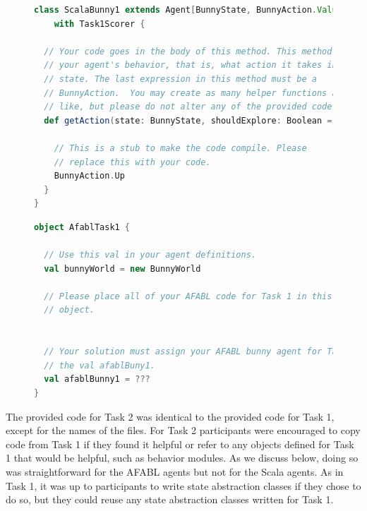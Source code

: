 \begin{figure}[!h]
\begin{center}

\begin{lstlisting}[language=Scala]
class ScalaBunny1 extends Agent[BunnyState, BunnyAction.Value]
    with Task1Scorer {

  // Your code goes in the body of this method. This method defines
  // your agent's behavior, that is, what action it takes in a given
  // state. The last expression in this method must be a
  // BunnyAction.  You may create as many helper functions as you
  // like, but please do not alter any of the provided code.
  def getAction(state: BunnyState, shouldExplore: Boolean = false) = {

    // This is a stub to make the code compile. Please
    // replace this with your code.
    BunnyAction.Up
  }
}
\end{lstlisting}

\caption{}
\end{center}
\label{fig:scala-task1-provided}
\end{figure}


\begin{figure}[!h]
\begin{center}

\begin{lstlisting}[language=Scala]
object AfablTask1 {

  // Use this val in your agent definitions.
  val bunnyWorld = new BunnyWorld

  // Please place all of your AFABL code for Task 1 in this singleton
  // object.


  // Your solution must assign your AFABL bunny agent for Task 1 to
  // the val afablBuny1.
  val afablBunny1 = ???
}
\end{lstlisting}

\caption{}
\end{center}
\label{fig:afabl-task1-provided}
\end{figure}


The provided code for Task 2 was identical to the provided code for Task 1, except for the names of the files. For Task 2 participants were encouraged to copy code from Task 1 if they found it helpful or refer to any objects defined for Task 1 that would be helpful, such as behavior modules. As we discuss below, doing so was straightforward for the AFABL agents but not for the Scala agents. As in Task 1, it was up to participants to write state abstraction classes if they chose to do so, but they could reuse any state abstraction classes written for Task 1.

